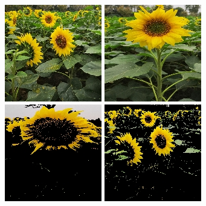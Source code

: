 \documentclass[supercite]{HustGraduPaper}
\begin{document}
\begin{sloppypar}
\begin{figure}[H]
\begin{minipage}[t]{0.24\textwidth}
     \includegraphics[scale=0.55]{te2.jpg}
 
     \includegraphics[scale=0.55]{te3.jpg}
     \end{minipage}
     \begin{minipage}[t]{0.24\textwidth}
     \centering
     \includegraphics[scale=0.55]{seg11.jpg}
 
     \includegraphics[scale=0.55]{seg21.jpg}
  

\end{minipage}
\end{figure}
\end{sloppypar}
\end{document}
